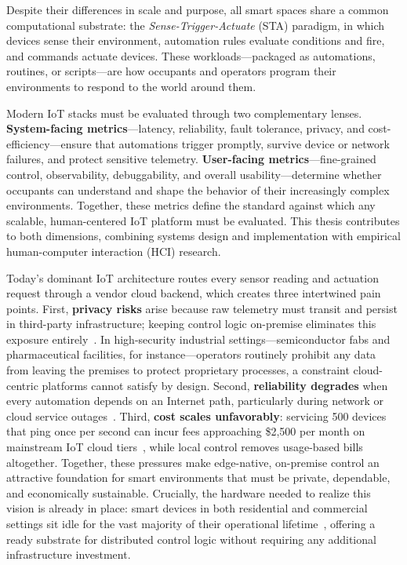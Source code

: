 Despite their differences in scale and purpose, all smart spaces share a common computational substrate: the \emph{Sense-Trigger-Actuate} (STA) paradigm, in which devices sense their environment, automation rules evaluate conditions and fire, and commands actuate devices. These workloads---packaged as automations, routines, or scripts---are how occupants and operators program their environments to respond to the world around them.

Modern IoT stacks must be evaluated through two complementary lenses. \textbf{System-facing metrics}---latency, reliability, fault tolerance, privacy, and cost-efficiency---ensure that automations trigger promptly, survive device or network failures, and protect sensitive telemetry. \textbf{User-facing metrics}---fine-grained control, observability, debuggability, and overall usability---determine whether occupants can understand and shape the behavior of their increasingly complex environments. Together, these metrics define the standard against which any scalable, human-centered IoT platform must be evaluated. This thesis contributes to both dimensions, combining systems design and implementation with empirical human-computer interaction (HCI) research.

Today's dominant IoT architecture routes every sensor reading and actuation request through a vendor cloud backend, which creates three intertwined pain points. First, \textbf{privacy risks} arise because raw telemetry must transit and persist in third-party infrastructure; keeping control logic on-premise eliminates this exposure entirely~\cite{HACloudless, csa2025matter}. In high-security industrial settings---semiconductor fabs and pharmaceutical facilities, for instance---operators routinely prohibit any data from leaving the premises to protect proprietary processes, a constraint cloud-centric platforms cannot satisfy by design. Second, \textbf{reliability degrades} when every automation depends on an Internet path, particularly during network or cloud service outages~\cite{gcloud-down1}. Third, \textbf{cost scales unfavorably}: servicing 500 devices that ping once per second can incur fees approaching \$2{,}500 per month on mainstream IoT cloud tiers~\cite{AzureIoTHub}, while local control removes usage-based bills altogether. Together, these pressures make edge-native, on-premise control an attractive foundation for smart environments that must be private, dependable, and economically sustainable. Crucially, the hardware needed to realize this vision is already in place: smart devices in both residential and commercial settings sit idle for the vast majority of their operational lifetime~\cite{hyperedge}, offering a ready substrate for distributed control logic without requiring any additional infrastructure investment.

